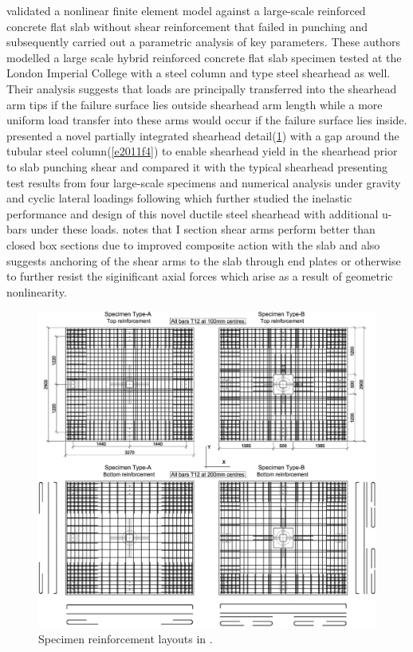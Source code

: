 \documentclass[twocolumn]{article} %
\begin{document}
\cite{eder2010} validated a nonlinear finite element model against a large-scale reinforced concrete flat slab without shear reinforcement that failed in punching and subsequently carried out a parametric analysis of key parameters. These authors modelled a large scale hybrid reinforced concrete flat slab specimen tested at the London Imperial College with a steel column and \cite{aci31808} type steel shearhead as well. Their analysis suggests that loads are principally transferred into the shearhead arm tips if the failure surface lies outside shearhead arm length while a more uniform load transfer into these arms would occur if the failure surface lies inside. \cite{EDER20111164} presented a novel partially integrated shearhead detail(\ref{e2011f3}) with a gap around the tubular steel column(\ref{e2011f4}) to enable shearhead yield in the shearhead prior to slab punching shear and compared it with the typical \cite{aci31808} shearhead presenting test results from four large-scale specimens and numerical analysis under gravity and cyclic lateral loadings following which \cite{EDER2012239} further studied the inelastic performance and design of this novel ductile steel shearhead with additional u-bars under these loads. \cite{EDER2012239} notes that I section shear arms perform better than closed box sections due to improved composite action with the slab and also suggests anchoring of the shear arms to the slab through end plates or otherwise to further resist the siginificant axial forces which arise as a result of geometric nonlinearity. 
    \begin{figure}\centering
    \includegraphics[width=\columnwidth]{Figures/e2011f3.pdf}
    \caption{Specimen reinforcement layouts in \cite{EDER20111164}.}
    \label{e2011f3}
    \end{figure}
\end{document}
